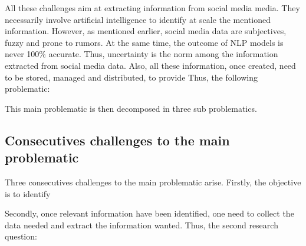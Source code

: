 All these challenges aim at extracting information from social media media.
They necessarily involve artificial intelligence to identify at scale the mentioned information.
However, as mentioned earlier, social media data are subjectives, fuzzy and prone to rumors.
At the same time, the outcome of NLP models is never 100\% accurate.
Thus, uncertainty is the norm among the information extracted from social media data.
Also, all these information, once created, need to be stored, managed and distributed, to provide
Thus, the following problematic:

\begin{center}
\end{center}

This main problematic is then decomposed in three sub problematics.

\subsection{Consecutives challenges to the main problematic}
Three consecutives challenges to the main problematic arise.
Firstly, the objective is to identify

\begin{center}
\end{center}

Secondly, once relevant information have been identified, one need to collect the data needed and
extract the information wanted. Thus, the second research question:

\begin{center}
\end{center}

